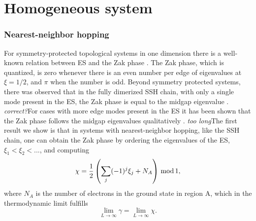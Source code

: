 \documentclass[twocolumn,amsmath,longbibliography,amssymb,superscriptaddress]{revtex4-1}
\newcommand{\mariac}[1]{{\it\color{cyan}#1}}
\begin{document}


\section{Homogeneous system}

\subsubsection{Nearest-neighbor hopping}


For symmetry-protected topological systems in one dimension there is a well-known relation between ES and the Zak phase \cite{Peschel2008}. The Zak phase, which is quantized, is zero whenever there is an even number per edge of eigenvalues at $\xi = 1/2$, and $\pi$ when the number is odd. Beyond symmetry protected systems, there was observed that in the fully dimerized SSH chain, with only a single mode present in the ES, the Zak phase is equal to the midgap eigenvalue \cite{Ryu2006}. \mariac{correct?}For cases with more edge modes present in the ES it has been shown that the Zak phase follows the midgap eigenvalues qualitatively \cite{Huang2012,Huang2012-2}. \mariac{too long}The first result we show is that in systems with nearest-neighbor hopping, like the SSH chain, one can obtain the Zak phase by ordering the eigenvalues of the ES, $\xi_1 < \xi_2 < ...$, and computing
\begin{equation}
\chi = \frac{1}{2}\left(\sum_j (-1)^j \xi_j+N_A\right) \, {\rm mod} \, 1,
\label{eqplusminus}
\end{equation}
where $N_A$ is the number of electrons in the ground state in region A, which in the thermodynamic limit fulfills
\begin{equation}
\lim_{L \rightarrow \infty} \gamma = \lim_{L \rightarrow \infty} \chi.
\end{equation}
\end{document}
